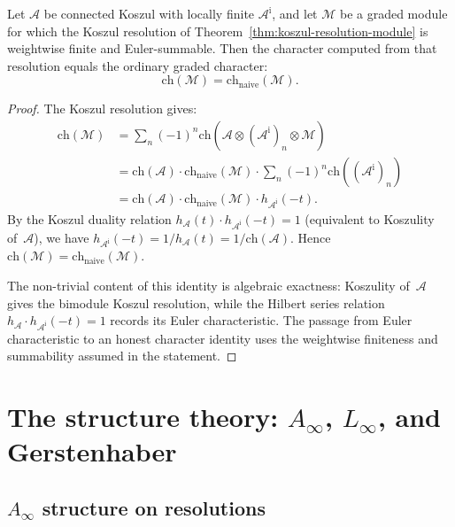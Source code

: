 \begin{corollary}\label{cor:character-koszul}
Let $\mathcal A$ be connected Koszul with locally finite
$\mathcal{A}^{\mathrm{i}}$, and let $\mathcal M$ be a graded module
for which the Koszul resolution of
Theorem~\textup{\ref{thm:koszul-resolution-module}} is weightwise
finite and Euler-summable. Then the character computed from that
resolution equals the ordinary graded character:
\[
\mathrm{ch}(\mathcal{M}) = \mathrm{ch}_{\mathrm{naive}}(\mathcal{M}).
\]
\end{corollary}

\begin{proof}
The Koszul resolution gives:
\begin{align}
\mathrm{ch}(\mathcal{M}) &= \sum_n (-1)^n \mathrm{ch}(\mathcal{A} \otimes (\mathcal{A}^{\mathrm{i}})_n \otimes \mathcal{M}) \\
&= \mathrm{ch}(\mathcal{A}) \cdot \mathrm{ch}_{\mathrm{naive}}(\mathcal{M}) \cdot \sum_n (-1)^n \mathrm{ch}((\mathcal{A}^{\mathrm{i}})_n) \\
&= \mathrm{ch}(\mathcal{A}) \cdot \mathrm{ch}_{\mathrm{naive}}(\mathcal{M}) \cdot h_{\mathcal{A}^{\mathrm{i}}}(-t).
\end{align}
By the Koszul duality relation
$h_{\mathcal{A}}(t) \cdot h_{\mathcal{A}^{\mathrm{i}}}(-t) = 1$
(equivalent to Koszulity of~$\mathcal{A}$), we have
$h_{\mathcal{A}^{\mathrm{i}}}(-t) = 1/h_{\mathcal{A}}(t)
= 1/\mathrm{ch}(\mathcal{A})$. Hence
$\mathrm{ch}(\mathcal{M}) = \mathrm{ch}_{\mathrm{naive}}(\mathcal{M})$.

The non-trivial content of this identity is algebraic exactness:
Koszulity of~$\mathcal A$ gives the bimodule Koszul resolution, while
the Hilbert series relation
$h_{\mathcal{A}} \cdot h_{\mathcal{A}^{\mathrm{i}}}(-t) = 1$
records its Euler characteristic. The passage from Euler
characteristic to an honest character identity uses the weightwise
finiteness and summability assumed in the statement.
\end{proof}

\section{\texorpdfstring{The structure theory: $A_\infty$, $L_\infty$, and Gerstenhaber}{The structure theory: A-infinity, L-infinity, and Gerstenhaber}}

\subsection{\texorpdfstring{$A_\infty$ structure on resolutions}{A-infinity structure on resolutions}}

